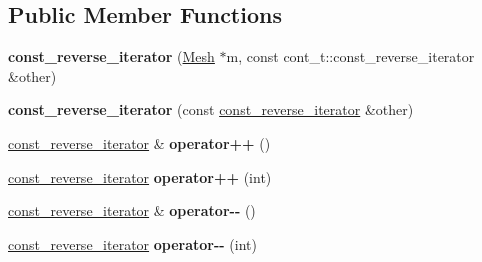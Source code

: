 \subsection*{Public Member Functions}
\begin{DoxyCompactItemize}
\item 
\hypertarget{classINMOST_1_1ElementArray_1_1const__reverse__iterator_a037f9eec05ca80423cd9b9d6b3457048}{{\bfseries const\-\_\-reverse\-\_\-iterator} (\hyperlink{classINMOST_1_1Mesh}{Mesh} $\ast$m, const cont\-\_\-t\-::const\-\_\-reverse\-\_\-iterator \&other)}\label{classINMOST_1_1ElementArray_1_1const__reverse__iterator_a037f9eec05ca80423cd9b9d6b3457048}

\item 
\hypertarget{classINMOST_1_1ElementArray_1_1const__reverse__iterator_abf0f45810cb52f5d1090fc0b796c81cf}{{\bfseries const\-\_\-reverse\-\_\-iterator} (const \hyperlink{classINMOST_1_1ElementArray_1_1const__reverse__iterator}{const\-\_\-reverse\-\_\-iterator} \&other)}\label{classINMOST_1_1ElementArray_1_1const__reverse__iterator_abf0f45810cb52f5d1090fc0b796c81cf}

\item 
\hypertarget{classINMOST_1_1ElementArray_1_1const__reverse__iterator_a3525dcb7a3c19446311fb8874d5c2ab9}{\hyperlink{classINMOST_1_1ElementArray_1_1const__reverse__iterator}{const\-\_\-reverse\-\_\-iterator} \& {\bfseries operator++} ()}\label{classINMOST_1_1ElementArray_1_1const__reverse__iterator_a3525dcb7a3c19446311fb8874d5c2ab9}

\item 
\hypertarget{classINMOST_1_1ElementArray_1_1const__reverse__iterator_a10fe3e91cb322c3d60ad39457b34e5a8}{\hyperlink{classINMOST_1_1ElementArray_1_1const__reverse__iterator}{const\-\_\-reverse\-\_\-iterator} {\bfseries operator++} (int)}\label{classINMOST_1_1ElementArray_1_1const__reverse__iterator_a10fe3e91cb322c3d60ad39457b34e5a8}

\item 
\hypertarget{classINMOST_1_1ElementArray_1_1const__reverse__iterator_af051be64b3c28d4e2d7c66ec910a9b3b}{\hyperlink{classINMOST_1_1ElementArray_1_1const__reverse__iterator}{const\-\_\-reverse\-\_\-iterator} \& {\bfseries operator-\/-\/} ()}\label{classINMOST_1_1ElementArray_1_1const__reverse__iterator_af051be64b3c28d4e2d7c66ec910a9b3b}

\item 
\hypertarget{classINMOST_1_1ElementArray_1_1const__reverse__iterator_a16c2693ac33c483b26edd8e9de4b16a7}{\hyperlink{classINMOST_1_1ElementArray_1_1const__reverse__iterator}{const\-\_\-reverse\-\_\-iterator} {\bfseries operator-\/-\/} (int)}\label{classINMOST_1_1ElementArray_1_1const__reverse__iterator_a16c2693ac33c483b26edd8e9de4b16a7}


\end{DoxyCompactItemize}
